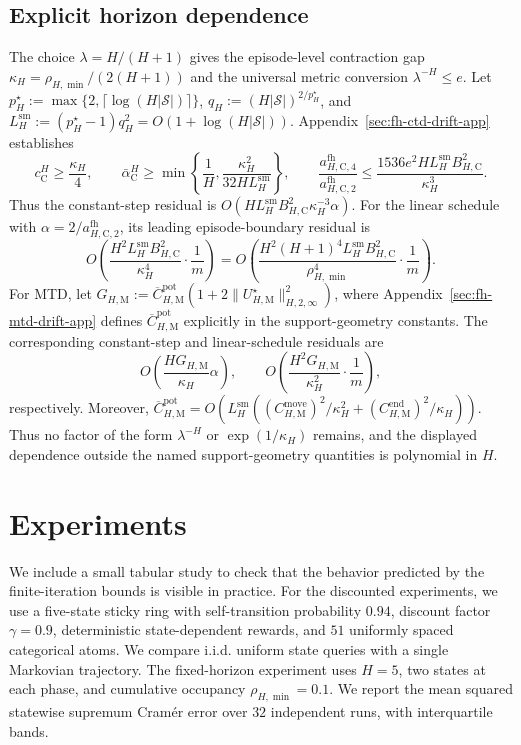 \documentclass{article}
\newcommand{\X}{\mathcal{S}}
\begin{document}
\subsection{Explicit horizon dependence}
The choice $\lambda=H/(H+1)$ gives the episode-level contraction gap $\kappa_H=\rho_{H,\min}/(2(H+1))$ and the universal metric conversion $\lambda^{-H}\le e$. Let $p_H^\star:=\max\{2,\lceil\log(H\lvert\X\rvert)\rceil\}$, $q_H:=(H\lvert\X\rvert)^{2/p_H^\star}$, and $L_H^{\mathrm{sm}}:=(p_H^\star-1)q_H^2=O(1+\log(H\lvert\X\rvert))$. Appendix~\ref{sec:fh-ctd-drift-app} establishes
\begin{equation}
c_{\mathrm C}^H\ge\frac{\kappa_H}{4},\qquad \bar\alpha_{\mathrm C}^H\ge\min\left\{\frac{1}{H},\frac{\kappa_H^2}{32HL_H^{\mathrm{sm}}}\right\},\qquad \frac{a_{H,\mathrm C,4}^{\mathrm{fh}}}{a_{H,\mathrm C,2}^{\mathrm{fh}}}\le\frac{1536e^2HL_H^{\mathrm{sm}}B_{H,\mathrm C}^2}{\kappa_H^3}.
\end{equation}
Thus the constant-step residual is $O(HL_H^{\mathrm{sm}}B_{H,\mathrm C}^2\kappa_H^{-3}\alpha)$. For the linear schedule with $\alpha=2/a_{H,\mathrm C,2}^{\mathrm{fh}}$, its leading episode-boundary residual is
\begin{equation}
O\left(\frac{H^2L_H^{\mathrm{sm}}B_{H,\mathrm C}^2}{\kappa_H^4}\cdot\frac{1}{m}\right)=O\left(\frac{H^2(H+1)^4L_H^{\mathrm{sm}}B_{H,\mathrm C}^2}{\rho_{H,\min}^4}\cdot\frac{1}{m}\right).
\end{equation}
For MTD, let $G_{H,\mathrm M}:=\overline C_{H,\mathrm M}^{\mathrm{pot}}(1+2\lVert U_{H,\mathrm M}^\star\rVert_{H,2,\infty}^2)$, where Appendix~\ref{sec:fh-mtd-drift-app} defines $\overline C_{H,\mathrm M}^{\mathrm{pot}}$ explicitly in the support-geometry constants. The corresponding constant-step and linear-schedule residuals are
\begin{equation}
O\left(\frac{HG_{H,\mathrm M}}{\kappa_H}\alpha\right),\qquad O\left(\frac{H^2G_{H,\mathrm M}}{\kappa_H^2}\cdot\frac{1}{m}\right),
\end{equation}
respectively. Moreover, $\overline C_{H,\mathrm M}^{\mathrm{pot}}=O(L_H^{\mathrm{sm}}((C_{H,\mathrm M}^{\mathrm{move}})^2/\kappa_H^2+(C_{H,\mathrm M}^{\mathrm{end}})^2/\kappa_H))$. Thus no factor of the form $\lambda^{-H}$ or $\exp(1/\kappa_H)$ remains, and the displayed dependence outside the named support-geometry quantities is polynomial in $H$.

\section{Experiments}\label{sec:experiments}
We include a small tabular study to check that the behavior predicted by the finite-iteration bounds is visible in practice. For the discounted experiments, we use a five-state sticky ring with self-transition probability $0.94$, discount factor $\gamma=0.9$, deterministic state-dependent rewards, and $51$ uniformly spaced categorical atoms. We compare i.i.d. uniform state queries with a single Markovian trajectory. The fixed-horizon experiment uses $H=5$, two states at each phase, and cumulative occupancy $\rho_{H,\min}=0.1$. We report the mean squared statewise supremum Cram\'er error over $32$ independent runs, with interquartile bands.
\end{document}
